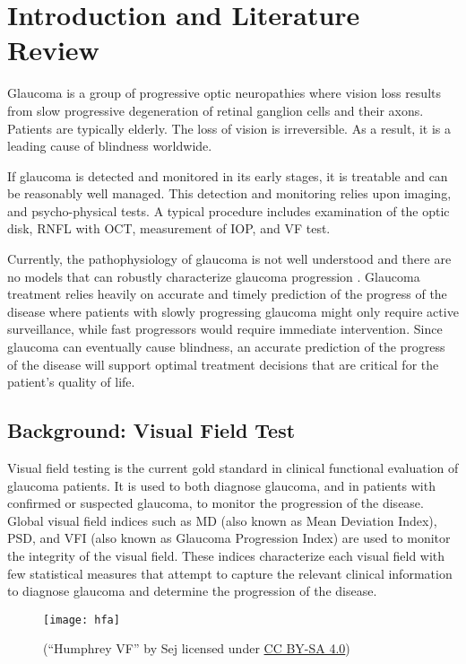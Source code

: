 \chapter{Introduction and Literature Review}

Glaucoma is a group of progressive optic neuropathies where vision loss results from slow progressive degeneration of retinal ganglion cells and their axons. \cite{Weinreb2004} Patients are typically elderly. The loss of vision is irreversible. As a result, it is a leading cause of blindness worldwide. 

If glaucoma is detected and monitored in its early stages, it is treatable and can be reasonably well managed. This detection and monitoring relies upon imaging, and psycho-physical tests. A typical procedure includes examination of the optic disk, \ac{RNFL} with \ac{OCT}, measurement of \ac{IOP}, and \acl{VF} test.

Currently, the pathophysiology of glaucoma is not well understood and there are no models that can robustly characterize glaucoma progression \cite{Chen2014}. Glaucoma treatment relies heavily on accurate and timely prediction of the progress of the disease where patients with slowly progressing glaucoma might only require active surveillance, while fast progressors would require immediate intervention. Since glaucoma can eventually cause blindness, an accurate prediction of the progress of the disease will support optimal treatment decisions that are critical for the patient’s quality of life.  

\section{Background: Visual Field Test}

Visual field testing is the current gold standard in clinical functional evaluation of glaucoma patients. It is used to both diagnose glaucoma, and in patients with confirmed or suspected glaucoma, to monitor the progression of the disease. Global visual field indices such as \ac{MD} (also known as Mean Deviation Index), \ac{PSD}, and \ac{VFI} (also known as Glaucoma Progression Index) are used to monitor the integrity of the visual field. These indices characterize each visual field with few statistical measures that attempt to capture the relevant clinical information to diagnose glaucoma and determine the progression of the disease. 

\begin{figure}[t]
	\centering
	\texttt{[image: hfa]}
	\caption[\acl{HFA}]{ (``Humphrey VF'' by Sej licensed under \href{https://creativecommons.org/licenses/by-sa/4.0/deed.en}{CC BY-SA 4.0})}
	\label{fig:hfa}
\end{figure} 

